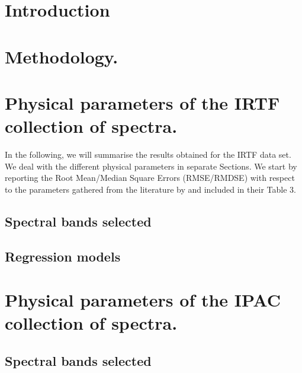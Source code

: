 \documentclass[printer]{aa}
\begin{document}
\section{Introduction}
\label{sec:intro}







\section{Methodology.}
\label{sec:meth}


\section{Physical parameters of the IRTF collection of spectra.}
\label{sec:irtf}

In the following, we will summarise the results obtained for the IRTF
data set. We deal with the different physical parameters in separate
Sections. We start by reporting the Root Mean/Median Square Errors
(RMSE/RMDSE) with respect to the parameters gathered from the
literature by \cite{cesetti} and included in their Table 3.

\subsection{Spectral bands selected}

\subsection{Regression models}


\section{Physical parameters of the IPAC collection of spectra.}
\label{sec:ipac}

\subsection{Spectral bands selected}

\end{document}
